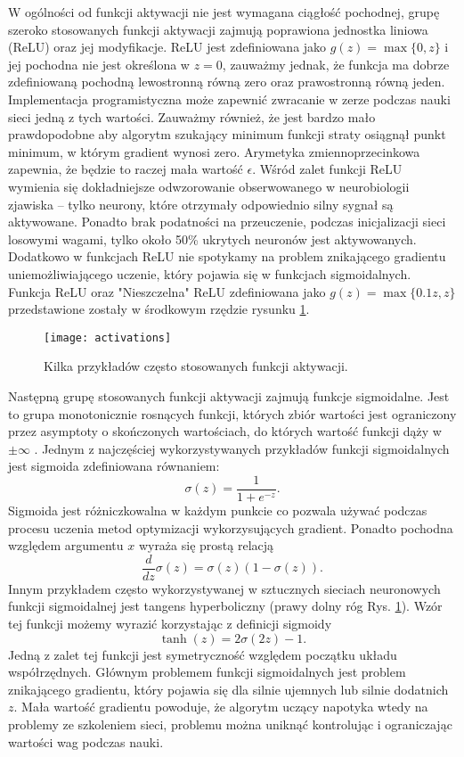 \documentclass[11pt]{book}
\theoremstyle{definition}
\begin{document}
W ogólności od funkcji aktywacji nie jest wymagana ciągłość pochodnej, grupę szeroko stosowanych funkcji aktywacji zajmują poprawiona jednostka liniowa (ReLU) oraz jej modyfikacje. ReLU jest zdefiniowana jako $g(z) = \max \{0, z\}$ i jej pochodna nie jest określona w $z = 0$, zauważmy jednak, że funkcja ma dobrze zdefiniowaną pochodną lewostronną równą zero oraz prawostronną równą jeden. Implementacja programistyczna może zapewnić zwracanie w zerze podczas nauki sieci jedną z tych wartości. Zauważmy również, że jest bardzo mało prawdopodobne aby algorytm szukający minimum funkcji straty osiągnął punkt minimum, w którym gradient wynosi zero. Arymetyka zmiennoprzecinkowa zapewnia, że będzie to raczej mała wartość $\epsilon$. Wśród zalet funkcji ReLU wymienia się dokładniejsze odwzorowanie obserwowanego w neurobiologii zjawiska -- tylko neurony, które otrzymały odpowiednio silny sygnał są aktywowane. Ponadto brak podatności na przeuczenie, podczas inicjalizacji sieci losowymi wagami, tylko około 50\% ukrytych neuronów jest aktywowanych. Dodatkowo w funkcjach ReLU nie spotykamy na problem znikającego gradientu uniemożliwiającego uczenie, który pojawia się w funkcjach sigmoidalnych. Funkcja ReLU oraz "Nieszczelna" ReLU zdefiniowana jako $g(z) = \max \{0.1 z, z\}$ przedstawione zostały w środkowym rzędzie rysunku \ref{fig:activations}. 

%
\begin{figure}[h!]
	\centering
	\texttt{[image: activations]}
	\caption{Kilka przykładów często stosowanych funkcji aktywacji.}
	\label{fig:activations}
\end{figure}
%
Następną grupę stosowanych funkcji aktywacji zajmują funkcje sigmoidalne. Jest to grupa monotonicznie rosnących funkcji, których zbiór wartości jest ograniczony przez asymptoty o skończonych wartościach, do których wartość funkcji dąży w $\pm \infty$ \cite{LeCun:1998:EB:645754.668382}. Jednym z najczęściej wykorzystywanych przykładów funkcji sigmoidalnych jest sigmoida zdefiniowana równaniem:
%
\begin{equation}
\sigma(z) = \frac{1}{1+e^{-z}}.
\end{equation}
%
Sigmoida jest różniczkowalna w każdym punkcie co pozwala używać podczas procesu uczenia metod optymizacji wykorzysujących gradient. Ponadto pochodna względem argumentu $x$ wyraża się prostą relacją
%
\begin{equation}
\frac{d}{dz} \sigma(z)= \sigma(z)\left(1 - \sigma(z)\right).
\end{equation}
%
Innym przykładem często wykorzystywanej w sztucznych sieciach neuronowych funkcji sigmoidalnej jest tangens hyperboliczny (prawy dolny róg Rys. \ref{fig:activations}). Wzór tej funkcji możemy wyrazić korzystając z definicji sigmoidy
\begin{equation}
\tanh(z) = 2\sigma(2z)-1.
\end{equation}
%
Jedną z zalet tej funkcji jest symetryczność względem początku układu współrzędnych. Głównym problemem funkcji sigmoidalnych jest problem znikającego gradientu, który pojawia się dla silnie ujemnych lub silnie dodatnich $z$. Mała wartość gradientu powoduje, że algorytm uczący napotyka wtedy na problemy ze szkoleniem sieci, problemu można uniknąć kontrolując i ograniczając wartości wag podczas nauki.
\end{document}
